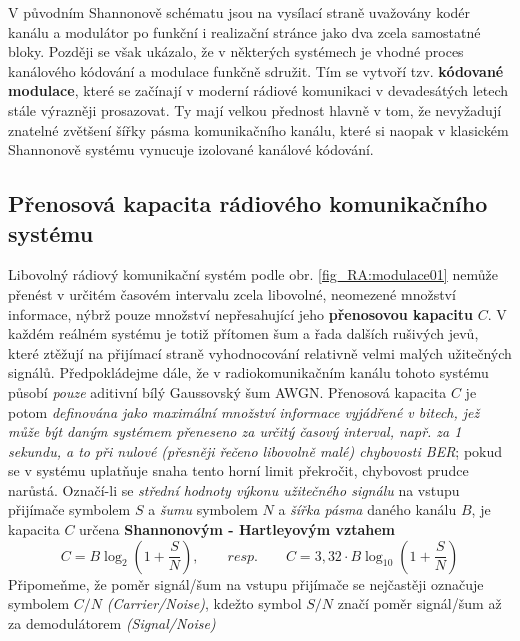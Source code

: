     V původním Shannonově schématu jsou na vysílací straně uvažovány kodér kanálu a modulátor po funkční i 
    realizační stránce jako dva zcela samostatné bloky. Později se však ukázalo, že v některých systémech je 
    vhodné proces kanálového kódování a modulace funkčně sdružit. Tím se vytvoří tzv. \textbf{kódované 
    modulace}, které se začínají v moderní rádiové komunikaci v devadesátých letech stále výrazněji 
    prosazovat. Ty mají velkou přednost hlavně v tom, že nevyžadují znatelné zvětšení šířky pásma 
    komunikačního kanálu, které si naopak v klasickém Shannonově systému vynucuje izolované kanálové kódování.
    \cite[s.~75]{ZaludRA}
    
    \subsection{Přenosová kapacita rádiového komunikačního systému}
      Libovolný rádiový komunikační systém podle obr. \ref{fig_RA:modulace01} nemůže přenést v určitém 
      časovém intervalu zcela libovolné, neomezené množství informace, nýbrž pouze množství nepřesahující 
      jeho \textbf{přenosovou kapacitu} \(C\). V každém reálném systému je totiž přítomen šum a řada dalších 
      rušivých jevů, které ztěžují na přijímací straně vyhodnocování relativně velmi malých užitečných 
      signálů. Předpokládejme dále, že v radiokomunikačním kanálu tohoto systému působí \emph{pouze} aditivní 
      bílý Gaussovský šum AWGN. Přenosová kapacita \(C\) je potom \emph{definována jako maximální množství 
      informace vyjádřené v bitech, jež může být daným systémem přeneseno za určitý časový interval, např. za 
      1 sekundu, a to při nulové (přesněji řečeno libovolně malé) chybovosti BER}; pokud se v systému 
      uplatňuje snaha tento horní limit překročit, chybovost prudce narůstá. Označí-li se \emph{střední 
      hodnoty výkonu užitečného signálu} na vstupu přijímače symbolem \(S\) a \emph{šumu} symbolem \(N\) a 
      \emph{šířka pásma} daného kanálu \(B\), je kapacita \(C\) určena \textbf{Shannonovým - Hartleyovým 
      vztahem}
      \begin{equation}\label{eq:RA_shannon_C01}
        C =           B\log_2\left(1+\frac{S}{N}\right),\qquad resp.\qquad 
        C = 3,32\cdot B\log_{10}\left(1+\frac{S}{N}\right)
      \end{equation}
      Připomeňme, že poměr signál/šum na vstupu přijímače se nejčastěji označuje symbolem \(C/N\) 
      \emph{(Carrier/Noise)}, kdežto symbol \(S/N\) značí poměr signál/šum až za demodulátorem 
      \emph{(Signal/Noise)}
      
